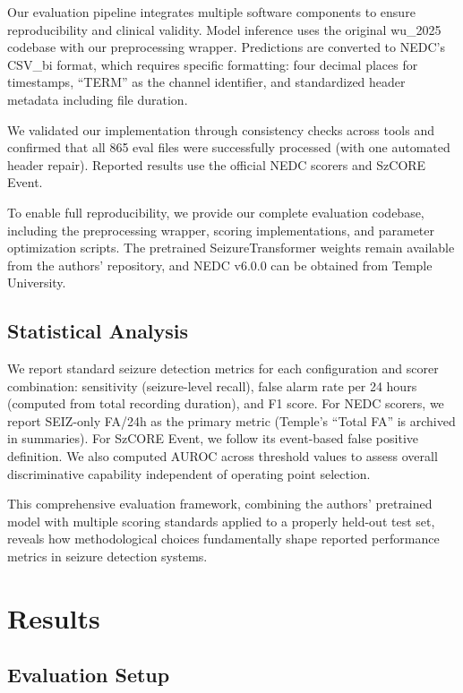 \documentclass[
]{article}
\begin{document}
Our evaluation pipeline integrates multiple software components to
ensure reproducibility and clinical validity. Model inference uses the
original wu\_2025 codebase with our preprocessing wrapper. Predictions
are converted to NEDC's CSV\_bi format, which requires specific
formatting: four decimal places for timestamps, ``TERM'' as the channel
identifier, and standardized header metadata including file duration.

We validated our implementation through consistency checks across tools
and confirmed that all 865 eval files were successfully processed (with
one automated header repair). Reported results use the official NEDC
scorers and SzCORE Event.

To enable full reproducibility, we provide our complete evaluation
codebase, including the preprocessing wrapper, scoring implementations,
and parameter optimization scripts. The pretrained SeizureTransformer
weights remain available from the authors' repository, and NEDC v6.0.0
can be obtained from Temple University.

\hypertarget{statistical-analysis}{%
\subsection{Statistical Analysis}\label{statistical-analysis}}

We report standard seizure detection metrics for each configuration and
scorer combination: sensitivity (seizure-level recall), false alarm rate
per 24 hours (computed from total recording duration), and F1 score. For
NEDC scorers, we report SEIZ-only FA/24h as the primary metric (Temple's
``Total FA'' is archived in summaries). For SzCORE Event, we follow its
event-based false positive definition. We also computed AUROC across
threshold values to assess overall discriminative capability independent
of operating point selection.

This comprehensive evaluation framework, combining the authors'
pretrained model with multiple scoring standards applied to a properly
held-out test set, reveals how methodological choices fundamentally
shape reported performance metrics in seizure detection systems.

\hypertarget{results}{%
\section{Results}\label{results}}

\hypertarget{evaluation-setup}{%
\subsection{Evaluation Setup}\label{evaluation-setup}}
\end{document}
